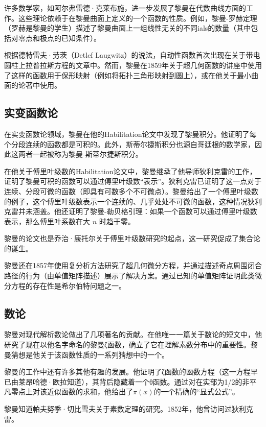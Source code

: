 许多数学家，如阿尔弗雷德·克莱布施，进一步发展了黎曼在代数曲线方面的工作。这些理论依赖于在黎曼曲面上定义的一个函数的性质。例如，黎曼-罗赫定理（罗赫是黎曼的学生）描述了黎曼曲面上一组线性无关的不同ials的数量（其中包括对零点和极点的已知条件）。

根据德特雷夫·劳茨（Detlef Laugwitz）的说法，自动性函数首次出现在关于带电圆柱上拉普拉斯方程的文章中。然而，黎曼在1859年关于超几何函数的讲座中使用了这样的函数用于保形映射（例如将拓扑三角形映射到圆上），或在他关于最小曲面的论著中使用。
\subsection{实变函数论}
在实变函数论领域，黎曼在他的Habilitation论文中发现了黎曼积分。他证明了每个分段连续的函数都是可积的。此外，斯蒂尔捷斯积分也源自哥廷根的数学家，因此这两者一起被称为黎曼-斯蒂尔捷斯积分。

在他关于傅里叶级数的Habilitation论文中，黎曼继承了他导师狄利克雷的工作，证明了黎曼可积的函数可以通过傅里叶级数“表示”。狄利克雷已证明了这一点对于连续、分段可微的函数（即具有可数多个不可微点）。黎曼给出了一个傅里叶级数的例子，这个傅里叶级数表示一个连续的、几乎处处不可微的函数，这种情况狄利克雷并未涵盖。他还证明了黎曼-勒贝格引理：如果一个函数可以通过傅里叶级数表示，那么傅里叶系数在大 \(n\) 时趋于零。

黎曼的论文也是乔治·康托尔关于傅里叶级数研究的起点，这一研究促成了集合论的诞生。

黎曼还在1857年使用复分析方法研究了超几何微分方程，并通过描述奇点周围闭合路径的行为（由单值矩阵描述）展示了解决方案。通过已知的单值矩阵证明此类微分方程的存在性是希尔伯特问题之一。
\subsection{数论}
黎曼对现代解析数论做出了几项著名的贡献。在他唯一一篇关于数论的短文中，他研究了现在以他名字命名的黎曼ζ函数，确立了它在理解素数分布中的重要性。黎曼猜想是他关于该函数性质的一系列猜想中的一个。

黎曼的工作中还有许多其他有趣的发展。他证明了ζ函数的函数方程（这一方程早已由莱昂哈德·欧拉知道），其背后隐藏着一个θ函数。通过对在实部为1/2的非平凡零点上对该近似函数的求和，他给出了\(\pi(x)\)的一个精确的“显式公式”。

黎曼知道帕夫努季·切比雪夫关于素数定理的研究。1852年，他曾访问过狄利克雷。
